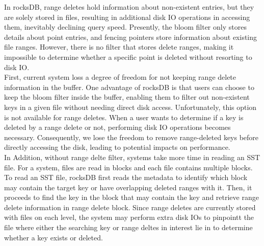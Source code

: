 In rocksDB, range deletes hold information about non-existent entries, but they are solely stored in files, resulting in additional disk IO operations in accessing them, inevitably declining query speed. Presently, the bloom filter only stores details about point entries, and fencing pointers store information about existing file ranges. However, there is no filter that stores delete ranges, making it impossible to determine whether a specific point is deleted without resorting to disk IO. \\

First, current system loss a degree of freedom for not keeping range delete information in the buffer. One advantage of rocksDB is that users can choose to keep the bloom filter inside the buffer, enabling them to filter out non-existent keys in a given file without needing direct disk access. Unfortunately, this option is not available for range deletes. When a user wants to determine if a key is deleted by a range delete or not, performing disk IO operations becomes necessary. Consequently, we lose the freedom to remove range-deleted keys before directly accessing the disk, leading to potential impacts on performance. \\

In Addition, without range delte filter, systems take more time in reading an SST file. For a system, files are read in blocks and each file contains multiple blocks. To read an SST file, rocksDB first reads the metadata to identify which block may contain the target key or have overlapping deleted ranges with it. Then, it proceeds to find the key in the block that may contain the key and retrieve range delete information in range delete block. Since range deletes are currently stored with files on each level, the system may perform extra disk IOs to pinpointt the file where either the searching key or range deltes in interest lie in to determine whether a key exists or deleted. \\